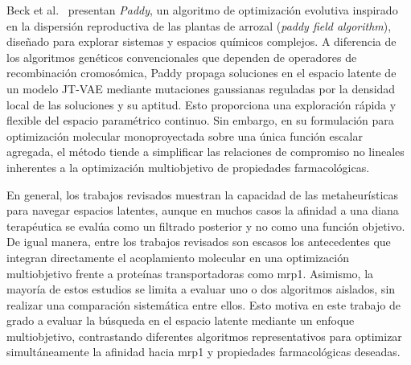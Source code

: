 

\enlargethispage{2\baselineskip}


Beck et al.~\cite{Beck2025} presentan \textit{Paddy}, un algoritmo de optimización evolutiva inspirado en la dispersión reproductiva de las plantas de arrozal (\textit{paddy field algorithm}), diseñado para explorar sistemas y espacios químicos complejos. A diferencia de los algoritmos genéticos convencionales que dependen de operadores de recombinación cromosómica, Paddy propaga soluciones en el espacio latente de un modelo JT-VAE mediante mutaciones gaussianas reguladas por la densidad local de las soluciones y su aptitud. Esto proporciona una exploración rápida y flexible del espacio paramétrico continuo. Sin embargo, en su formulación para optimización molecular monoproyectada sobre una única función escalar agregada, el método tiende a simplificar las relaciones de compromiso no lineales inherentes a la optimización multiobjetivo de propiedades farmacológicas.
 
En general, los trabajos revisados muestran la capacidad de las metaheurísticas para navegar espacios latentes, aunque en muchos casos la afinidad a una diana terapéutica se evalúa como un filtrado posterior y no como una función objetivo. De igual manera, entre los trabajos revisados son escasos los antecedentes que integran directamente el acoplamiento molecular en una optimización multiobjetivo frente a proteínas transportadoras como \gls{mrp1}. Asimismo, la mayoría de estos estudios se limita a evaluar uno o dos algoritmos aislados, sin realizar una comparación sistemática entre ellos. Esto motiva en este trabajo de grado a evaluar la búsqueda en el espacio latente mediante un enfoque multiobjetivo, contrastando diferentes algoritmos representativos para optimizar simultáneamente la afinidad hacia \gls{mrp1} y propiedades farmacológicas deseadas.